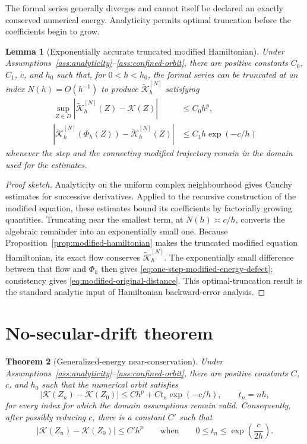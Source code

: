 \documentclass[11pt,a4paper]{article}
\newtheorem{theorem}{Theorem}[section]
\newtheorem{lemma}[theorem]{Lemma}
\theoremstyle{definition}
\theoremstyle{remark}
\newcommand{\K}{\mathcal{K}}
\newcommand{\Kh}{\widetilde{\mathcal{K}}_h}
\newcommand{\PhiNum}{\Phi_h}
\newcommand{\abs}[1]{\left\lvert #1\right\rvert}
\begin{document}
The formal series generally diverges and cannot itself be declared an exactly
conserved numerical energy.  Analyticity permits optimal truncation before
the coefficients begin to grow.

\begin{lemma}[Exponentially accurate truncated modified Hamiltonian]
\label{lem:exponential-modified-hamiltonian}
Under Assumptions~\ref{ass:analyticity}--\ref{ass:confined-orbit}, there are
positive constants $C_0$, $C_1$, $c$, and $h_0$ such that, for
$0<h<h_0$, the formal series can be truncated at an index $N(h)=O(h^{-1})$
to produce $\Kh^{[N]}$ satisfying
\begin{align}
 \sup_{Z\in D}\abs{\Kh^{[N]}(Z)-\K(Z)}
 &\leq C_0h^p,
 \label{eq:modified-original-distance}\\
 \abs{\Kh^{[N]}(\PhiNum(Z))-\Kh^{[N]}(Z)}
 &\leq C_1h\exp(-c/h)
 \label{eq:one-step-modified-energy-defect}
\end{align}
whenever the step and the connecting modified trajectory remain in the
domain used for the estimates.
\end{lemma}

\begin{proof}[Proof sketch]
Analyticity on the uniform complex neighbourhood gives Cauchy estimates for
successive derivatives.  Applied to the recursive construction of the
modified equation, these estimates bound its coefficients by factorially
growing quantities.  Truncating near the smallest term, at
$N(h)\asymp c/h$, converts the algebraic remainder into an exponentially small
one.  Because Proposition~\ref{prop:modified-hamiltonian} makes the truncated
modified equation Hamiltonian, its exact flow conserves $\Kh^{[N]}$.  The
exponentially small difference between that flow and $\PhiNum$ then gives
\eqref{eq:one-step-modified-energy-defect}; consistency gives
\eqref{eq:modified-original-distance}.  This optimal-truncation result is the
standard analytic input of Hamiltonian backward-error analysis.
\end{proof}

\section{No-secular-drift theorem}

\begin{theorem}[Generalized-energy near-conservation]
\label{thm:no-secular-drift}
Under Assumptions~\ref{ass:analyticity}--\ref{ass:confined-orbit}, there are
positive constants $C$, $c$, and $h_0$ such that the numerical orbit satisfies
\begin{equation}
 \abs{\K(Z_n)-\K(Z_0)}
 \leq Ch^p+C t_n\exp(-c/h),
 \qquad t_n=nh,
 \label{eq:full-energy-bound}
\end{equation}
for every index for which the domain assumptions remain valid.  Consequently,
after possibly reducing $c$, there is a constant $C'$ such that
\begin{equation}
 \boxed{
 \abs{\K(Z_n)-\K(Z_0)}\leq C'h^p
 \qquad\text{when}\qquad
 0\leq t_n\leq\exp\!\left(\frac{c}{2h}\right).}
 \label{eq:exponentially-long-bound}
\end{equation}
\end{theorem}
\end{document}
